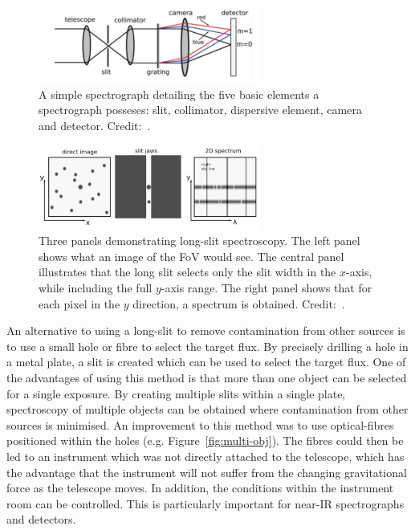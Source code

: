 \begin{figure}
 \centering
 \includegraphics[width=0.65\textwidth]{kmos/Lawrence-spectrograph}
 \caption[Simple Spectrograph]{A simple spectrograph detailing the five basic elements a spectrograph posseses: slit, collimator, dispersive element, camera and detector.
 Credit:~\cite{2014amcg.book.....L}.
 \label{fig:spectrograph}}
\end{figure}

\begin{figure}
 \centering
 \includegraphics[width=0.65\textwidth]{kmos/Lawrence-long-slit}
 \caption[Long-slit Spectroscopy]{Three panels demonstrating long-slit spectroscopy.
 The left panel shows what an image of the FoV would see.
 The central panel illustrates that the long slit selects only the slit width in the $x$-axis, while including the full $y$-axis range.
 The right panel shows that for each pixel in the $y$ direction, a spectrum is obtained.
 Credit:~\cite{2014amcg.book.....L}.
 \label{fig:long-slit}}
\end{figure}

An alternative to using a long-slit to remove contamination from other sources is to use a small hole or fibre to select the target flux.
By precisely drilling a hole in a metal plate, a slit is created which can be used to select the target flux.
One of the advantages of using this method is that more than one object can be selected for a single exposure.
By creating multiple slits within a single plate, spectroscopy of multiple objects can be obtained where contamination from other sources is minimised.
An improvement to this method was to use optical-fibres positioned within the holes (e.g. Figure~\ref{fig:multi-obj}).
The fibres could then be led to an instrument which was not directly attached to the telescope, which has the advantage that the instrument will not suffer from the changing gravitational force as the telescope moves.
In addition, the conditions within the instrument room can be controlled.
This is particularly important for near-IR spectrographs and detectors.

